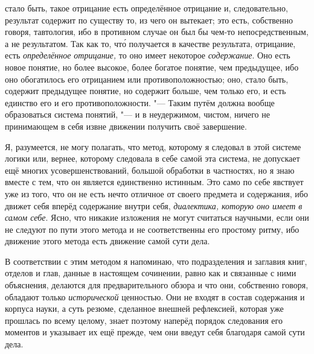 стало быть, такое отрицание есть определённое отрицание и, следовательно,
результат содержит по существу то, из чего он вытекает; это есть, собственно
говоря, тавтология, ибо в противном случае он был бы чем-то непосредственным,
а не результатом. Так как то, чт\'{о} получается в качестве результата,
отрицание, есть {\em определённое отрицание,}
то оно имеет некоторое {\em содержание}. Оно есть новое
понятие, но более высокое, более богатое понятие, чем предыдущее, ибо оно
обогатилось его отрицанием или противоположностью; оно, стало быть,
содержит предыдущее понятие, но содержит больше, чем только его,
и есть единство его и его противоположности. "--- Таким путём должна
вообще образоваться система понятий, "--- и в неудержимом, чистом, ничего не
принимающем в себя извне движении получить своё завершение.

Я, разумеется, не могу полагать, что метод, которому я следовал в этой
системе логики или, вернее, которому следовала в себе самой эта система, не
допускает ещё многих усовершенствований, большой обработки в частностях, но
я знаю вместе с тем, что он является единственно истинным. Это само по себе
явствует уже из того, что он не есть нечто отличное от своего предмета и
содержания, ибо движет себя вперёд содержание внутри себя,
{\em диалектика, которую оно имеет в самом себе}. Ясно,
что никакие изложения не могут считаться научными, если они не следуют по
пути этого метода и не соответственны его простому ритму, ибо движение
этого метода есть движение самой сути дела.

В соответствии с этим методом я напоминаю, что подразделения и заглавия
книг, отделов и глав, данные в настоящем сочинении, равно как и связанные с
ними объяснения, делаются для предварительного обзора и что они, собственно
говоря, обладают только {\em исторической} ценностью.
Они не входят в состав содержания и корпуса науки, а суть резюме, сделанное
внешней рефлексией, которая уже прошлась по всему целому, знает поэтому
наперёд порядок следования его моментов и указывает их ещё прежде, чем они
введут себя благодаря самой сути дела.

